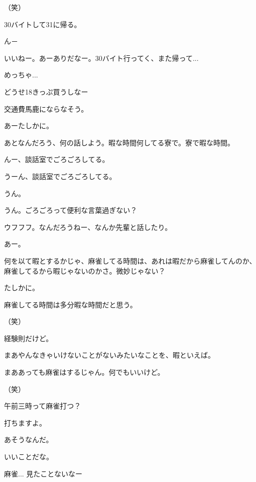 \begin{multicols}{3}
{        （笑）

        30バイトして31に帰る。

        ん－

        いいねー。あーありだなー。30バイト行ってく、また帰って...

        めっちゃ...

        どうせ18きっぷ買うしなー

        交通費馬鹿にならなそう。

        あーたしかに。

        あとなんだろう、何の話しよう。暇な時間何してる寮で。寮で暇な時間。

        んー、談話室でごろごろしてる。

        うーん、談話室でごろごろしてる。

        うん。

        うん。ごろごろって便利な言葉過ぎない？

        ウフフフ。なんだろうねー、なんか先輩と話したり。

        あー。

        何を以て暇とするかじゃ、麻雀してる時間は、あれは暇だから麻雀してんのか、麻雀してるから暇じゃないのかさ。微妙じゃない？

        たしかに。

        麻雀してる時間は多分暇な時間だと思う。

        （笑）

        経験則だけど。

        まあやんなきゃいけないことがないみたいなことを、暇といえば。

        まああっても麻雀はするじゃん。何でもいいけど。

        （笑）

        午前三時って麻雀打つ？

        打ちますよ。

        あそうなんだ。

        いいことだな。

        麻雀... 見たことないなー

}
\end{multicols}

